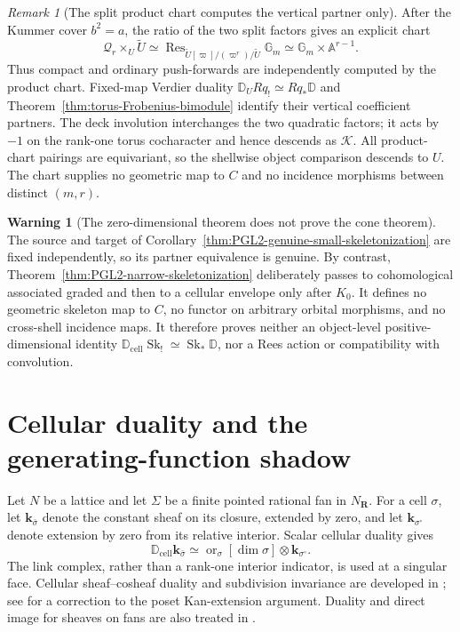 \documentclass[11pt]{article}
\theoremstyle{definition}
\newtheorem{warning}[theorem]{Warning}
\theoremstyle{remark}
\newtheorem{remark}[theorem]{Remark}
\newcommand{\cK}{\mathcal K}
\newcommand{\D}{\mathbb D}
\newcommand{\Dcell}{\mathbb D_{\mathrm{cell}}}
\newcommand{\Sk}{\operatorname{Sk}}
\begin{document}
\begin{remark}[The split product chart computes the vertical partner only]
After the Kummer cover $b^2=a$, the ratio of the two split factors gives an
explicit chart
\begin{equation}
 \mathscr Q_r\times_U\widetilde U
 \simeq
 \operatorname{Res}_{\widetilde U[\varpi]/(\varpi^r)/\widetilde U}
 \mathbb G_m
 \simeq\mathbb G_m\times\mathbb A^{r-1}.
 \label{eq:PGL2-split-tame-product-chart}
\end{equation}
Thus compact and ordinary push-forwards are independently computed by the
product chart.  Fixed-map Verdier duality
$\D_U Rq_!\simeq Rq_*\D$ and
Theorem~\ref{thm:torus-Frobenius-bimodule} identify their vertical coefficient
partners.  The deck involution interchanges the two
quadratic factors; it acts by $-1$ on the rank-one torus cocharacter and hence
descends as $\cK$.  All product-chart pairings are equivariant, so the
shellwise object comparison descends to $U$.  The chart supplies no geometric
map to $C$ and no incidence morphisms between distinct $(m,r)$.
\end{remark}

\begin{warning}[The zero-dimensional theorem does not prove the cone theorem]
The source and target of
Corollary~\ref{thm:PGL2-genuine-small-skeletonization} are fixed independently,
so its partner equivalence is genuine.  By contrast,
Theorem~\ref{thm:PGL2-narrow-skeletonization} deliberately passes to
cohomological associated graded and then to a cellular envelope only after
$K_0$.  It defines no geometric skeleton map to $C$, no functor on arbitrary
orbital morphisms, and no cross-shell incidence maps.  It therefore proves
neither an object-level positive-dimensional identity
$\Dcell\Sk_!\simeq\Sk_*\D$, nor a Rees action or compatibility with
convolution.
\end{warning}



\appendix
\section{Cellular duality and the generating-function shadow}

Let $N$ be a lattice and let $\Sigma$ be a finite pointed rational fan in
$N_\mathbf R$.  For a cell $\sigma$, let $\mathbf k_{\bar\sigma}$ denote the
constant sheaf on its closure, extended by zero, and let
$\mathbf k_{\sigma^\circ}$ denote extension by zero from its relative
interior.  Scalar cellular duality gives
\begin{equation}
 \Dcell\mathbf k_{\bar\sigma}
 \simeq
 \operatorname{or}_\sigma[\dim\sigma]
 \otimes\mathbf k_{\sigma^\circ}.
 \label{eq:cell-generator-duality}
\end{equation}
The link complex, rather than a rank-one interior indicator, is used at a
singular face.  Cellular sheaf--cosheaf duality and subdivision invariance are
developed in \cite{Curry}; see \cite{CurryErratum} for a correction to the
poset Kan-extension argument.  Duality and direct image for sheaves on fans
are also treated in \cite{BresslerLunts}.
\end{document}
